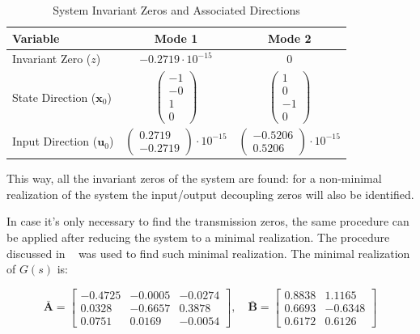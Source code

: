 \documentclass{scrreprt}
\begin{document}
\begin{table}[h]
    \centering
    \caption{System Invariant Zeros and Associated Directions}
    \label{tab:invariant_zeros}
    \renewcommand{\arraystretch}{1.5}
    \begin{tabular}{lcc}
        \toprule
        \textbf{Variable} & \textbf{Mode 1} & \textbf{Mode 2} \\ 
        \midrule
        Invariant Zero ($z$) & $-0.2719  \cdot 10^{-15}$ & $0$ \\ 
        \midrule
        State Direction ($\boldsymbol{x}_0$) & 
        $\begin{pmatrix} -1 \\ -0 \\ 1 \\ 0 \end{pmatrix}$ & 
        $\begin{pmatrix} 1 \\ 0 \\ -1 \\ 0 \end{pmatrix}$ \\ 
        \midrule
        Input Direction ($\boldsymbol{u}_0$) & 
        $\begin{pmatrix} 0.2719 \\ -0.2719 \end{pmatrix} \cdot 10^{-15}$ & 
        $\begin{pmatrix} -0.5206 \\ 0.5206 \end{pmatrix} \cdot 10^{-15}$ \\ 
        \bottomrule
    \end{tabular}

\end{table}



This way, all the invariant zeros of the system are found: for a non-minimal realization of the system the input/output decoupling zeros will also be identified.

In case it's only necessary to find the transmission zeros, the same procedure can be applied after reducing the system to a minimal realization. The procedure discussed in ~\cite{LectureNotes_5} was used to find such minimal realization. The minimal realization of $G(s)$ is:

\begin{equation}
    \bar{\boldsymbol{A}} = 
    \begin{bmatrix}
        -0.4725 & -0.0005 & -0.0274 \\
         0.0328 & -0.6657 &  0.3878 \\
         0.0751 &  0.0169 & -0.0054
    \end{bmatrix}, \quad
    \bar{\boldsymbol{B}} = 
    \begin{bmatrix}
        0.8838 &  1.1165 \\
        0.6693 & -0.6348 \\
        0.6172 &  0.6126
    \end{bmatrix}
\end{equation}
\end{document}
